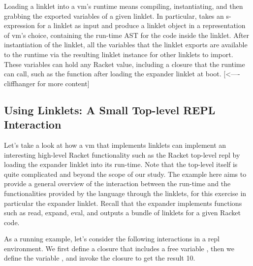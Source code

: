		\begin{paragraph-here}
			Loading a linklet into a \gls{vm}'s runtime means compiling, instantiating, and then grabbing the exported variables of a given linklet. In particular,  takes an s-expression for a linklet as input and produce a linklet object in a representation of \gls{vm}'s choice, containing the run-time AST for the code inside the linklet. After instantiation of the linklet, all the variables that the linklet exports are available to the runtime via the resulting linklet instance for other linklets to import. These variables can hold any Racket value, including a closure that the runtime can call, such as the  function after loading the expander linklet at boot.  [<---- cliffhanger for more content]
		\end{paragraph-here}

		\subsection{Using Linklets: A Small Top-level REPL Interaction}

		\begin{paragraph-here}
			Let’s take a look at how a \gls{vm} that implements linklets can implement an interesting high-level Racket functionality such as the Racket top-level \gls{repl} by loading the expander linklet into its run-time. Note that the top-level itself is quite complicated and beyond the scope of our study. The example here aims to provide a general overview of the interaction between the run-time and the functionalities provided by the language through the linklets, for this exercise in particular the expander linklet. Recall that the expander implements functions such as read, expand, eval, and outputs a bundle of linklets for a given Racket code.
		\end{paragraph-here}

		\begin{paragraph-here}
			As a running example, let’s consider the following interactions in a \gls{repl} environment. We first define a closure  that includes a free variable , then we define the variable , and invoke the closure to get the result 10.
		\end{paragraph-here}


